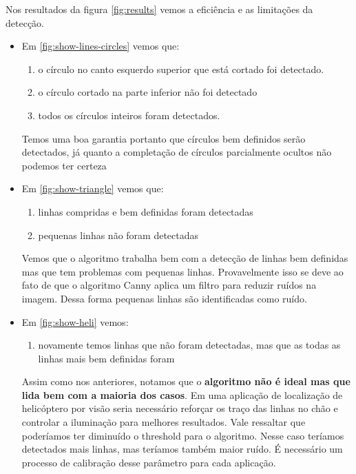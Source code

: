 \documentclass[journal]{IEEEtran}
\begin{document}
Nos resultados da figura \ref{fig:results} vemos a eficiência e as limitações da detecção.
\begin{itemize}


\item Em \ref{fig:show-lines-circles} vemos que:
		\begin{enumerate}
			\item  o círculo no canto esquerdo superior que está cortado
						foi detectado.
			\item o círculo cortado na parte inferior não foi detectado
			\item todos os círculos inteiros foram detectados. 
		\end{enumerate}	
			Temos uma boa garantia portanto que círculos bem definidos serão
		detectados, já quanto a completação de círculos parcialmente ocultos 
		não podemos ter certeza

\item Em \ref{fig:show-triangle} vemos que:
		\begin{enumerate}
			\item linhas compridas e bem definidas foram detectadas
			\item pequenas linhas não foram detectadas
		\end{enumerate}	
				Vemos que o algoritmo trabalha bem com a detecção de linhas bem definidas
			mas que tem problemas com pequenas linhas. Provavelmente isso se deve ao fato 
			de que o algoritmo Canny aplica um filtro para reduzir ruídos na imagem. Dessa forma
			pequenas linhas são identificadas como ruído.

\item Em \ref{fig:show-heli} vemos:
		\begin{enumerate}
			\item novamente temos linhas que não foram detectadas, mas que as todas
			as linhas mais bem definidas foram
		\end{enumerate}	
			Assim como nos anteriores, notamos que o \textbf{algoritmo não é ideal mas que lida
		bem com a maioria dos casos}. Em uma aplicação de localização de helicóptero 
		por visão seria necessário reforçar os traço das linhas no chão e controlar
		a iluminação para melhores
		resultados. Vale ressaltar que poderíamos ter diminuído o threshold para o algoritmo.
		Nesse caso teríamos detectados mais linhas, mas teríamos também maior ruído.
		É necessário um processo de calibração desse parâmetro para cada aplicação.
	

\end{itemize}
\end{document}
